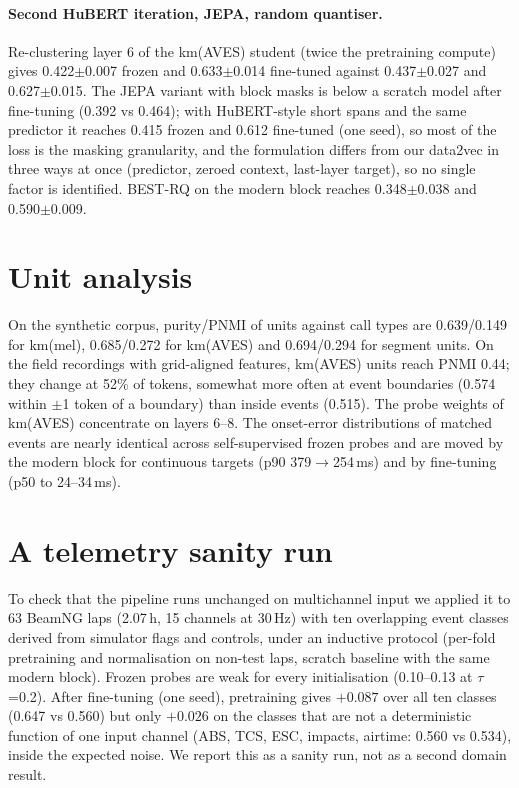 \documentclass[10pt,twocolumn]{article}
\begin{document}
\paragraph{Second HuBERT iteration, JEPA, random quantiser.} Re-clustering layer 6 of the km(AVES) student (twice the pretraining compute) gives 0.422$\pm$0.007 frozen and 0.633$\pm$0.014 fine-tuned against 0.437$\pm$0.027 and 0.627$\pm$0.015. The JEPA variant with block masks is below a scratch model after fine-tuning (0.392 vs 0.464); with HuBERT-style short spans and the same predictor it reaches 0.415 frozen and 0.612 fine-tuned (one seed), so most of the loss is the masking granularity, and the formulation differs from our data2vec in three ways at once (predictor, zeroed context, last-layer target), so no single factor is identified. BEST-RQ on the modern block reaches 0.348$\pm$0.038 and 0.590$\pm$0.009.

\section{Unit analysis}
On the synthetic corpus, purity/PNMI of units against call types are 0.639/0.149 for km(mel), 0.685/0.272 for km(AVES) and 0.694/0.294 for segment units. On the field recordings with grid-aligned features, km(AVES) units reach PNMI 0.44; they change at 52\% of tokens, somewhat more often at event boundaries (0.574 within $\pm$1 token of a boundary) than inside events (0.515). The probe weights of km(AVES) concentrate on layers 6--8. The onset-error distributions of matched events are nearly identical across self-supervised frozen probes and are moved by the modern block for continuous targets (p90 379$\to$254\,ms) and by fine-tuning (p50 to 24--34\,ms).

\section{A telemetry sanity run}
To check that the pipeline runs unchanged on multichannel input we applied it to 63 BeamNG laps (2.07\,h, 15 channels at 30\,Hz) with ten overlapping event classes derived from simulator flags and controls, under an inductive protocol (per-fold pretraining and normalisation on non-test laps, scratch baseline with the same modern block). Frozen probes are weak for every initialisation (0.10--0.13 at $\tau$=0.2). After fine-tuning (one seed), pretraining gives $+0.087$ over all ten classes (0.647 vs 0.560) but only $+0.026$ on the classes that are not a deterministic function of one input channel (ABS, TCS, ESC, impacts, airtime: 0.560 vs 0.534), inside the expected noise. We report this as a sanity run, not as a second domain result.
\end{document}
